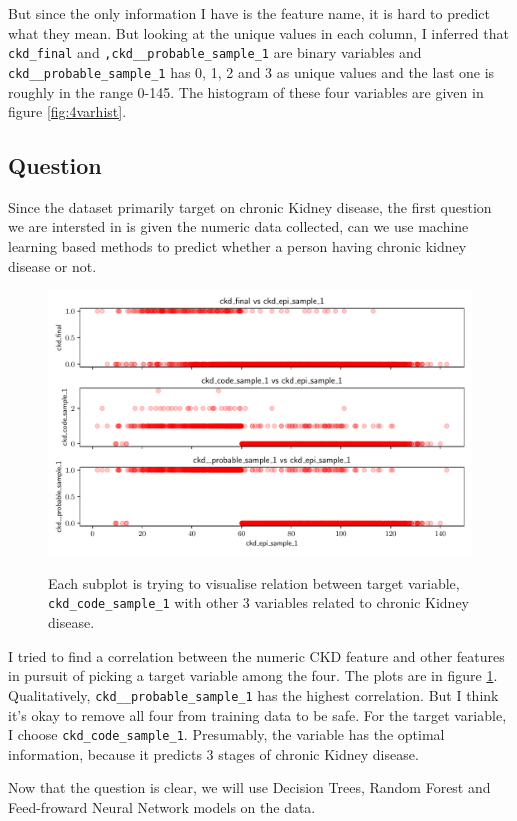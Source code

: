 \documentclass{article}
\begin{document}
But since the only information I have is the feature name, it is hard to predict what they mean.
But looking at the unique values in each column, I inferred that \texttt{ckd\_final} and 
\texttt{,ckd\_\_probable\_sample\_1} are binary variables and \texttt{ckd\_\_probable\_sample\_1} has 0, 1, 2
and 3 as unique values and the last one is roughly in the range 0-145. The histogram of these four variables 
are given in figure \ref{fig:4varhist}.

\subsection{Question}
Since the dataset primarily target on chronic Kidney disease, the first question we are intersted in is
given the numeric data collected, can we use machine learning based methods to predict whether a 
person having chronic kidney disease or not. 
\begin{figure}
    \centering
    \includegraphics[scale=.7]{targetvar_correlation.pdf}
    \label{fig:4varcorr}
    \caption{Each subplot is trying to visualise relation between target variable, \texttt{ckd\_code\_sample\_1}
    with other 3 variables related to chronic Kidney disease. }
\end{figure}
I tried to find a correlation between the numeric CKD feature and other features in pursuit of picking 
a target variable among the four. The plots are in figure \ref{fig:4varcorr}. Qualitatively, \texttt{ckd\_\_probable\_sample\_1} has the highest correlation. But 
I think it's okay to remove all four from training data to be safe. For the target variable, I choose 
\texttt{ckd\_code\_sample\_1}. Presumably, the variable has the optimal information, because it predicts
3 stages of chronic Kidney disease.\par 
Now that the question is clear, we will use Decision Trees, Random Forest and Feed-froward Neural Network models 
on the data. 
\end{document}
